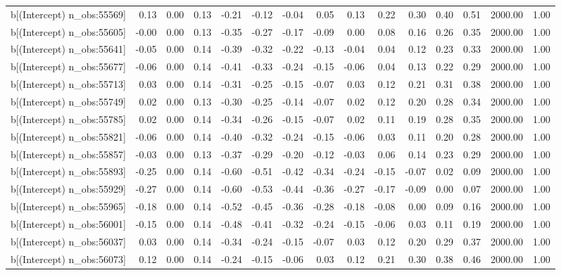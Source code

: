 \begin{table}[ht]
\begin{tabular}{rrrrrrrrrrrrrrr}
  b[(Intercept) n\_obs:55569] & 0.13 & 0.00 & 0.13 & -0.21 & -0.12 & -0.04 & 0.05 & 0.13 & 0.22 & 0.30 & 0.40 & 0.51 & 2000.00 & 1.00 \\ 
  b[(Intercept) n\_obs:55605] & -0.00 & 0.00 & 0.13 & -0.35 & -0.27 & -0.17 & -0.09 & 0.00 & 0.08 & 0.16 & 0.26 & 0.35 & 2000.00 & 1.00 \\ 
  b[(Intercept) n\_obs:55641] & -0.05 & 0.00 & 0.14 & -0.39 & -0.32 & -0.22 & -0.13 & -0.04 & 0.04 & 0.12 & 0.23 & 0.33 & 2000.00 & 1.00 \\ 
  b[(Intercept) n\_obs:55677] & -0.06 & 0.00 & 0.14 & -0.41 & -0.33 & -0.24 & -0.15 & -0.06 & 0.04 & 0.13 & 0.22 & 0.29 & 2000.00 & 1.00 \\ 
  b[(Intercept) n\_obs:55713] & 0.03 & 0.00 & 0.14 & -0.31 & -0.25 & -0.15 & -0.07 & 0.03 & 0.12 & 0.21 & 0.31 & 0.38 & 2000.00 & 1.00 \\ 
  b[(Intercept) n\_obs:55749] & 0.02 & 0.00 & 0.13 & -0.30 & -0.25 & -0.14 & -0.07 & 0.02 & 0.12 & 0.20 & 0.28 & 0.34 & 2000.00 & 1.00 \\ 
  b[(Intercept) n\_obs:55785] & 0.02 & 0.00 & 0.14 & -0.34 & -0.26 & -0.15 & -0.07 & 0.02 & 0.11 & 0.19 & 0.28 & 0.35 & 2000.00 & 1.00 \\ 
  b[(Intercept) n\_obs:55821] & -0.06 & 0.00 & 0.14 & -0.40 & -0.32 & -0.24 & -0.15 & -0.06 & 0.03 & 0.11 & 0.20 & 0.28 & 2000.00 & 1.00 \\ 
  b[(Intercept) n\_obs:55857] & -0.03 & 0.00 & 0.13 & -0.37 & -0.29 & -0.20 & -0.12 & -0.03 & 0.06 & 0.14 & 0.23 & 0.29 & 2000.00 & 1.00 \\ 
  b[(Intercept) n\_obs:55893] & -0.25 & 0.00 & 0.14 & -0.60 & -0.51 & -0.42 & -0.34 & -0.24 & -0.15 & -0.07 & 0.02 & 0.09 & 2000.00 & 1.00 \\ 
  b[(Intercept) n\_obs:55929] & -0.27 & 0.00 & 0.14 & -0.60 & -0.53 & -0.44 & -0.36 & -0.27 & -0.17 & -0.09 & 0.00 & 0.07 & 2000.00 & 1.00 \\ 
  b[(Intercept) n\_obs:55965] & -0.18 & 0.00 & 0.14 & -0.52 & -0.45 & -0.36 & -0.28 & -0.18 & -0.08 & 0.00 & 0.09 & 0.16 & 2000.00 & 1.00 \\ 
  b[(Intercept) n\_obs:56001] & -0.15 & 0.00 & 0.14 & -0.48 & -0.41 & -0.32 & -0.24 & -0.15 & -0.06 & 0.03 & 0.11 & 0.19 & 2000.00 & 1.00 \\ 
  b[(Intercept) n\_obs:56037] & 0.03 & 0.00 & 0.14 & -0.34 & -0.24 & -0.15 & -0.07 & 0.03 & 0.12 & 0.20 & 0.29 & 0.37 & 2000.00 & 1.00 \\ 
  b[(Intercept) n\_obs:56073] & 0.12 & 0.00 & 0.14 & -0.24 & -0.15 & -0.06 & 0.03 & 0.12 & 0.21 & 0.30 & 0.38 & 0.46 & 2000.00 & 1.00 \\ 

\end{tabular}
\end{table}
